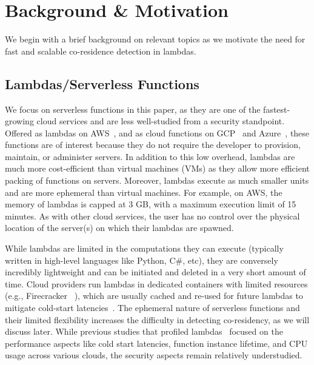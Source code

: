 \section{Background \& Motivation}
\label{sec:background}

We begin with a brief background on relevant topics as we motivate the need for
fast and scalable co-residence detection in lambdas.

\subsection{Lambdas/Serverless Functions} 
\label{sec:background:lambdas}

We focus on serverless functions in this paper, as they are one of the
fastest-growing cloud services and are less well-studied from a security
standpoint. Offered as lambdas on AWS~\cite{awslambda}, and as cloud functions
on GCP~\cite{gcpfunctions} and Azure~\cite{azurefunctions}, these functions are
of interest because they do not require the developer to provision, maintain, or
administer servers. In addition to this low overhead, lambdas are much more
cost-efficient than virtual machines (VMs) as they allow more efficient packing
of functions on servers. Moreover, lambdas execute as much smaller units  and
are more ephemeral than virtual machines.  For example, on AWS,
the memory of lambdas is capped at 3 GB, with a maximum execution limit of 15
minutes.  As with other cloud services, the user has no control over the
physical location of the server(s) on which their lambdas are spawned.

While lambdas are limited in the computations they can execute (typically
written in high-level languages like Python, C\#, etc), they are conversely
incredibly lightweight and can be initiated and deleted in a very short amount
of time. Cloud providers run lambdas in dedicated containers with limited
resources (e.g., Firecracker ~\cite{firecracker}), which are usually cached and
re-used for future lambdas to mitigate cold-start
latencies~\cite{awscontainerreuse}. The ephemeral nature of serverless functions
and their limited flexibility increases the difficulty in detecting
co-residency, as we will discuss later. While previous studies that profiled
lambdas~\cite{wangusenix2018} focused on the performance aspects like cold start
latencies, function instance lifetime, and CPU usage across various clouds,
the security aspects remain relatively understudied.


